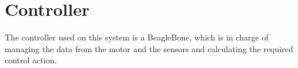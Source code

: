 \section{Controller}

The controller used on this system is a BeagleBone, which is in charge of managing the data from the motor and the sensors and calculating the required control action.
